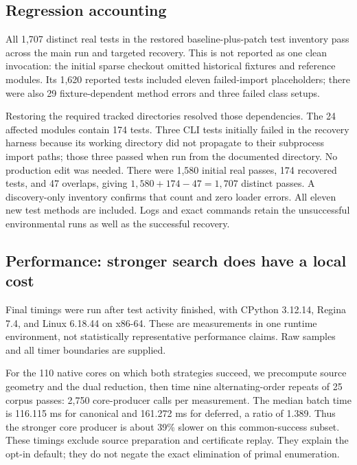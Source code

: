 \subsection{Regression accounting}

All 1,707 distinct real tests in the restored baseline-plus-patch test
inventory pass across the main run and targeted recovery.  This is not
reported as one clean invocation: the initial sparse checkout omitted
historical fixtures and reference modules.  Its 1,620 reported tests
included eleven failed-import placeholders; there were also 29
fixture-dependent method errors and three failed class setups.

Restoring the required tracked directories resolved those dependencies.
The 24 affected modules contain 174 tests.  Three CLI tests initially
failed in the recovery harness because its working directory did not
propagate to their subprocess import paths; those three passed when run
from the documented  directory.  No production edit was needed.
There were 1,580 initial real passes, 174 recovered tests, and 47 overlaps,
giving $1{,}580+174-47=1{,}707$ distinct passes.  A discovery-only inventory
confirms that count and zero loader errors.  All eleven new test methods
are included.  Logs and exact commands retain the unsuccessful
environmental runs as well as the successful recovery.

\subsection{Performance: stronger search does have a local cost}

Final timings were run after test activity finished, with CPython
3.12.14, Regina 7.4, and Linux 6.18.44 on x86-64.  These are measurements
in one runtime environment, not statistically representative performance
claims.  Raw samples and all timer boundaries are supplied.

For the 110 native cores on which both strategies succeed, we precompute
source geometry and the dual reduction, then time nine alternating-order
repeats of 25 corpus passes: 2,750 core-producer calls per measurement.
The median batch time is 116.115 ms for canonical and 161.272 ms for
deferred, a ratio of 1.389.  Thus the stronger core producer is about
39\% slower on this common-success subset.  These timings exclude source
preparation and certificate replay.  They explain the opt-in default;
they do not negate the exact elimination of primal enumeration.

